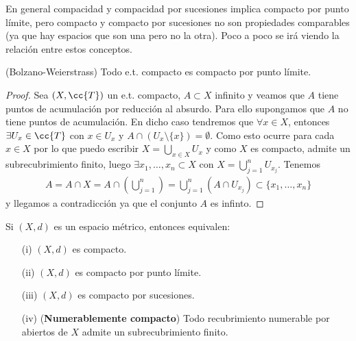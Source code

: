 En general compacidad y compacidad por sucesiones implica compacto por punto límite, pero compacto y compacto por sucesiones no son propiedades comparables (ya que hay espacios que son una pero no la otra). Poco a poco se irá viendo la relación entre estos conceptos.

\begin{prop}
    (Bolzano-Weierstrass) Todo e.t. compacto es compacto por punto límite.
    \begin{proof}
        Sea $(X, \cc{T})$ un e.t. compacto, $A\subset X$ infinito y veamos que $A$ tiene puntos de acumulación por reducción al absurdo. Para ello supongamos que $A$ no tiene puntos de acumulación. En dicho caso tendremos que $\forall x \in X$, entonces $\exists U_x\in \cc{T}$ con $x\in U_x$ y $A\cap(U_x\setminus \{x\})=\emptyset$. Como esto ocurre para cada $x\in X$ por lo que puedo escribir $X=\bigcup\limits_{x\in X}U_x$ y como $X$ es compacto, admite un subrecubrimiento finito, luego $\exists x_1,\dots,x_n\subset X$ con $X=\bigcup\limits_{j=1}^n U_{x_j}$. Tenemos
        \begin{align*}
            A=A\cap X = A \cap \left(\bigcup\limits_{j=1}^n\right) = \bigcup\limits_{j=1}^n(A\cap U_{x_j})\subset \{x_1,\dots,x_n\}
        \end{align*} 
        y llegamos a contradicción ya que el conjunto $A$ es infinto.

    \end{proof}
\end{prop}

\begin{teo}
    Si $(X, d)$ es un espacio métrico, entonces equivalen:
    \begin{enumerate}
        \item[(i)] $(X, d)$ es compacto.
        \item[(ii)] $(X, d)$ es compacto por punto límite.
        \item[(iii)] $(X, d)$ es compacto por sucesiones.
        \item[(iv)] (\textbf{Numerablemente compacto}) Todo recubrimiento numerable por abiertos de $X$ admite un subrecubrimiento finito.
    \end{enumerate}
\end{teo}

